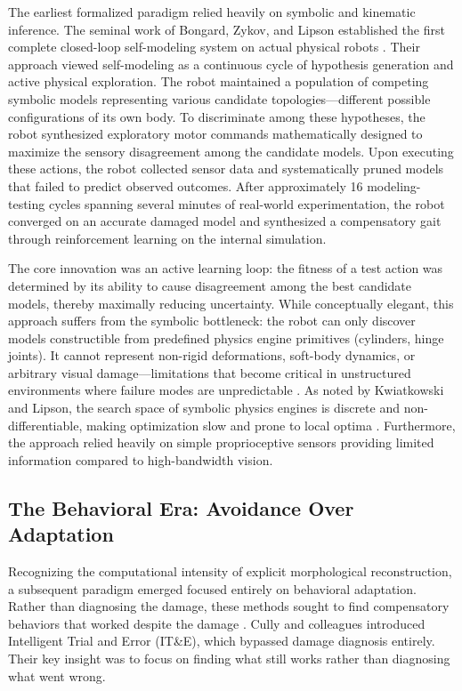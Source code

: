\documentclass[12pt,a4paper,oneside]{report}
\begin{document}
The earliest formalized paradigm relied heavily on symbolic and kinematic inference. The seminal work of Bongard, Zykov, and Lipson established the first complete closed-loop self-modeling system on actual physical robots \cite{bongard2006resilient}. Their approach viewed self-modeling as a continuous cycle of hypothesis generation and active physical exploration. The robot maintained a population of competing symbolic models representing various candidate topologies—different possible configurations of its own body. To discriminate among these hypotheses, the robot synthesized exploratory motor commands mathematically designed to maximize the sensory disagreement among the candidate models. Upon executing these actions, the robot collected sensor data and systematically pruned models that failed to predict observed outcomes. After approximately 16 modeling-testing cycles spanning several minutes of real-world experimentation, the robot converged on an accurate damaged model and synthesized a compensatory gait through reinforcement learning on the internal simulation.

The core innovation was an active learning loop: the fitness of a test action was determined by its ability to cause disagreement among the best candidate models, thereby maximally reducing uncertainty. While conceptually elegant, this approach suffers from the symbolic bottleneck: the robot can only discover models constructible from predefined physics engine primitives (cylinders, hinge joints). It cannot represent non-rigid deformations, soft-body dynamics, or arbitrary visual damage—limitations that become critical in unstructured environments where failure modes are unpredictable \cite{kwiatkowski2019task}. As noted by Kwiatkowski and Lipson, the search space of symbolic physics engines is discrete and non-differentiable, making optimization slow and prone to local optima \cite{kwiatkowski2019task}. Furthermore, the approach relied heavily on simple proprioceptive sensors providing limited information compared to high-bandwidth vision.

\subsection{The Behavioral Era: Avoidance Over Adaptation}

Recognizing the computational intensity of explicit morphological reconstruction, a subsequent paradigm emerged focused entirely on behavioral adaptation. Rather than diagnosing the damage, these methods sought to find compensatory behaviors that worked despite the damage \cite{cully2015robots}. Cully and colleagues introduced Intelligent Trial and Error (IT\&E), which bypassed damage diagnosis entirely. Their key insight was to focus on finding what still works rather than diagnosing what went wrong.
\end{document}
